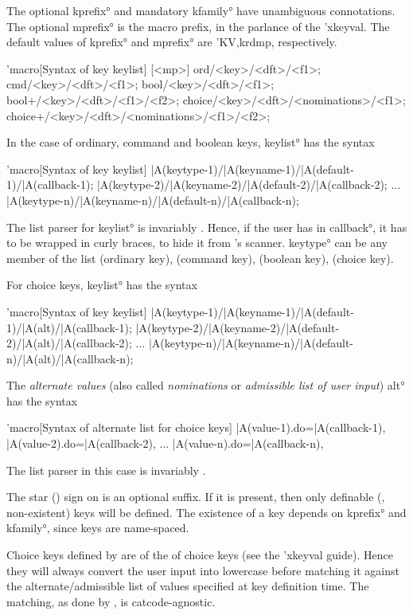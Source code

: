 \documentclass[
  use-a4-paper,
  use-10pt-font,
  final-version,
  use-UK-English,
  fancy-section-headings,
  frame-section-numbers,
  para-abstract-style,
  inputfile,
  input-config-file,
  no-hyperref-messages,
  wrapquote
]{amltxdoc}
\begin{document}
The optional \ang{kprefix} and mandatory \ang{kfamily} have unambiguous connotations. The optional \ang{mprefix} is the macro prefix, in the parlance of the \pkg'{xkeyval}. The default values of \ang{kprefix} and \ang{mprefix} are \ffx'{KV,krdmp}, respectively.

\start'{macro}[Syntax of key keylist]
[<mp>]{
  ord/<key>/<dft>/<f1>;
  cmd/<key>/<dft>/<f1>;
  bool/<key>/<dft>/<f1>;
  bool+/<key>/<dft>/<f1>/<f2>;
  choice/<key>/<dft>/<nominations>/<f1>;
  choice+/<key>/<dft>/<nominations>/<f1>/<f2>;
}

In the case of ordinary, command and boolean keys, \ang{keylist} has the syntax

\start'{macro}[Syntax of key keylist]
{
  |A(keytype-1)/|A(keyname-1)/|A(default-1)/|A(callback-1);
  |A(keytype-2)/|A(keyname-2)/|A(default-2)/|A(callback-2);
  ...
  |A(keytype-n)/|A(keyname-n)/|A(default-n)/|A(callback-n);
}

The list parser for \ang{keylist} is invariably \qsemicolon. Hence, if the user has \qsemicolon in \ang{callback}, it has to be wrapped in curly braces, to hide it from \tex's scanner. \ang{keytype} can be any member of the list \leftbrace{} (ordinary key),  (command key),  (boolean key),  (choice key)\rightbrace.

For choice keys, \ang{keylist} has the syntax

\start'{macro}[Syntax of key keylist]
{
  |A(keytype-1)/|A(keyname-1)/|A(default-1)/|A(alt)/|A(callback-1);
  |A(keytype-2)/|A(keyname-2)/|A(default-2)/|A(alt)/|A(callback-2);
  ...
  |A(keytype-n)/|A(keyname-n)/|A(default-n)/|A(alt)/|A(callback-n);
}

The \emph{alternate values} (also called \emph{nominations} or \emph{admissible list of user input}) \ang{alt} has the syntax

\start'{macro}[Syntax of alternate list for choice keys]
|A(value-1).do=|A(callback-1),
|A(value-2).do=|A(callback-2),
...
|A(value-n).do=|A(callback-n),

The list parser in this case is invariably \qcomma.

The star (\redstar*) sign on \fx{\krddefinekeys} is an optional suffix. If it is present, then only definable (\ie, non-existent) keys will be defined. The existence of a key depends on \ang{kprefix} and \ang{kfamily}, since keys are name-spaced.

\ltsnote
Choice keys defined by \fx{\krddefinekeys} are of the \stform of choice keys (see the \pkg'{xkeyval} guide). Hence they will always convert the user input into lowercase before matching it against the alternate/admissible list of values specified at key definition time. The matching, as done by \fx{\krdsetkeys}, is catcode-agnostic.
\end{document}
